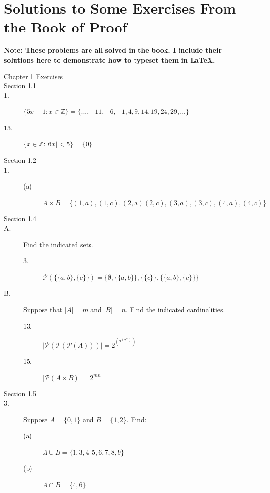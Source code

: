 \documentclass{article}
\begin{document}
\section{Solutions to Some Exercises From the Book of Proof}


{\bf Note:  These problems are all solved in the book.  I include their
solutions here to demonstrate how to typeset them in \LaTeX.}

\begin{description}

\item[Chapter 1 Exercises]
\item[Section 1.1]
\item[1.] $\{5x-1:x\in\mathbb{Z}\} = \{...,-11,-6,-1,4,9,14,19,24,29,...\}$
\item[13.] $\{x\in\mathbb{Z}:|6x|<5\} = \{0\}$

\item[Section 1.2]
\item[1.]
  \begin{description}
  \item[(a)] $A\times B = \{(1,a),(1,c),(2,a)(2,c),(3,a),(3,c),(4,a),(4,c)\}$
  \end{description}

\item[Section 1.4]
\item[A.] Find the indicated sets.
\begin{description}
\item[3.] $\mathcal{P}(\{\{a,b\},\{c\}\}) = \{\emptyset, \{\{a,b\}\}, \{\{c\}\}, \{\{a,b\},\{c\}\}\}$
\end{description}

\item[B.] Suppose that $|A|=m$ and $|B|=n$. Find the indicated cardinalities.
\begin{description}
\item[13.] $|\mathcal{P}(\mathcal{P}(\mathcal{P}(A)))| = 2^{(2^{(2^m)})}$
\item[15.] $|\mathcal{P}(A\times B)| = 2^{mn}$
\end{description}

\item[Section 1.5]
\item[3.] Suppose $A=\{0,1\}$ and $B=\{1,2\}$.  Find:
\begin{description}
\item[(a)] $A\cup B = \{1,3,4,5,6,7,8,9\}$
\item[(b)] $A\cap B = \{4,6\}$
\end{description}



\end{description}
\end{document}
